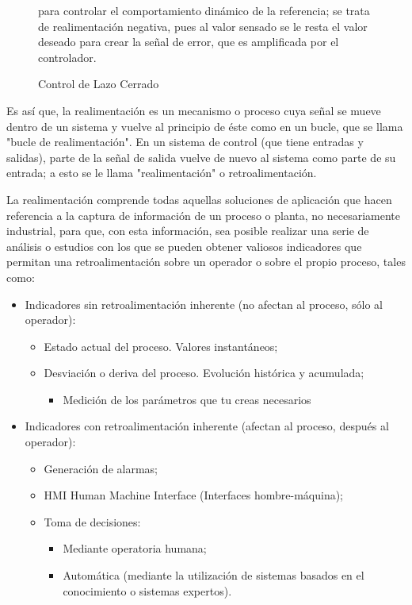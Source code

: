 \begin{figure}[h]
  \centering
  
  \caption{Control de Lazo Cerrado}
  para controlar el comportamiento dinámico de la referencia; se trata de
  realimentación negativa, pues al valor sensado se le resta el valor deseado
  para crear la señal de error, que es amplificada por el controlador.
  \label{fig:ControLazoCerrado}
\end{figure}

Es así que, la realimentación es un mecanismo o proceso cuya señal se mueve
dentro de un sistema y vuelve al principio de éste como en un bucle, que se
llama "bucle de realimentación". En un sistema de control (que tiene entradas y
salidas), parte de la señal de salida vuelve de nuevo al sistema como parte de
su entrada; a esto se le llama "realimentación" o retroalimentación.

La realimentación comprende todas aquellas soluciones de aplicación que hacen
referencia a la captura de información de un proceso o planta, no necesariamente
industrial, para que, con esta información, sea posible realizar una serie de
análisis o estudios con los que se pueden obtener valiosos indicadores que
 permitan una retroalimentación sobre un operador o sobre el propio proceso,
 tales como:
 \begin{itemize}
   \item Indicadores sin retroalimentación inherente (no afectan al proceso,
   sólo al operador):
   \begin{itemize}
     \item Estado actual del proceso. Valores instantáneos;
     \item Desviación o deriva del proceso. Evolución histórica y acumulada;
     \begin{itemize}
        \item Medición de los parámetros que tu creas necesarios
       \end{itemize}
   \end{itemize}
   \item Indicadores con retroalimentación inherente (afectan al proceso,
         después al operador):
   \begin{itemize}
     \item Generación de alarmas;
     \item HMI Human Machine Interface (Interfaces hombre-máquina);
     \item Toma de decisiones:
     \begin{itemize}
       \item Mediante operatoria humana;
       \item Automática (mediante la utilización de sistemas basados en el
             conocimiento o sistemas expertos).
     \end{itemize}
   \end{itemize}
 \end{itemize}


